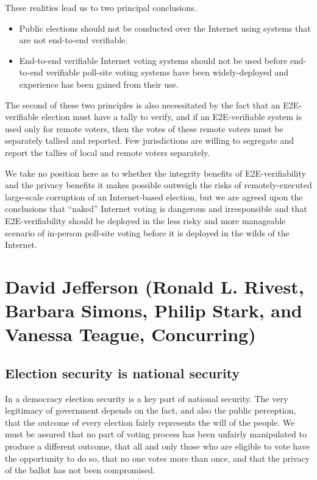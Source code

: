 These realities lead us to two principal conclusions.

\begin{itemize}
\item Public elections should not be conducted over the Internet
using systems that are not end-to-end verifiable.

\item End-to-end verifiable Internet voting systems should not be
used before end-to-end verifiable poll-site voting systems have been
widely-deployed and experience has been gained from their use.
\end{itemize}

The second of these two principles is also necessitated by the fact
that an E2E-verifiable election must have a tally to verify, and if an
E2E-verifiable system is used only for remote voters, then the votes
of these remote voters must be separately tallied and reported.  Few
jurisdictions are willing to segregate and report the tallies of local
and remote voters separately. 

We take no position here as to whether the integrity benefits of
E2E-verifiability and the privacy benefits it makes possible outweigh
the risks of remotely-executed large-scale corruption of an
Internet-based election, but we are agreed upon the conclusions that
“naked” Internet voting is dangerous and irresponsible and that
E2E-verifiability should be deployed in the less risky and more
manageable scenario of in-person poll-site voting before it is
deployed in the wilds of the Internet.

\section{David Jefferson (Ronald L. Rivest, Barbara Simons, Philip
  Stark, and Vanessa Teague, Concurring)}

\subsection{Election security is national security}

In a democracy election security is a key part of national
security. The very legitimacy of government depends on the fact, and
also the public perception, that the outcome of every election fairly
represents the will of the people. We must be assured that no part of
voting process has been unfairly manipulated to produce a different
outcome, that all and only those who are eligible to vote have the
opportunity to do so, that no one votes more than once, and that the
privacy of the ballot has not been compromised.

